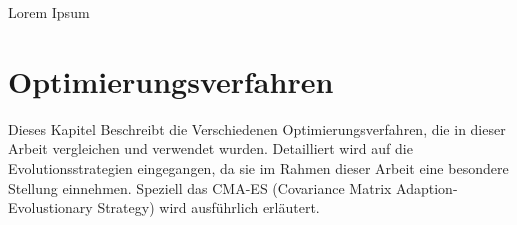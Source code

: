 \documentclass[a4paper,12pt,fleqn]{book}
\begin{document}
\setlength{\headheight}{36pt}

\begin{titlepage}
%
Lorem Ipsum
%
\end{titlepage}

\chapter{Optimierungsverfahren}

Dieses Kapitel Beschreibt die Verschiedenen Optimierungsverfahren, die in dieser Arbeit vergleichen und verwendet wurden. Detailliert wird auf die Evolutionsstrategien eingegangen, da sie im Rahmen dieser Arbeit eine besondere Stellung einnehmen. Speziell das CMA-ES (Covariance Matrix Adaption- Evolustionary Strategy) wird ausführlich erläutert.




%
%
\end{document}
